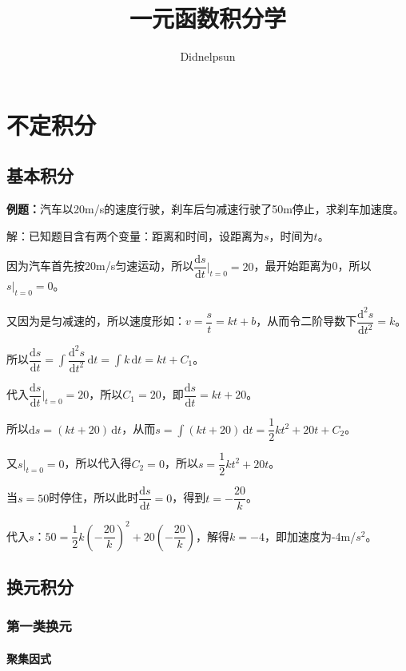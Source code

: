 \documentclass[UTF8, 12pt]{ctexart}
\author{Didnelpsun}
\title{一元函数积分学}
\date{}
\begin{document}
\maketitle
\pagestyle{empty}
\thispagestyle{empty}
\tableofcontents
\thispagestyle{empty}
\newpage
\pagestyle{plain}
\setcounter{page}{1}
\section{不定积分}
\subsection{基本积分}

\textbf{例题：}汽车以20m/s的速度行驶，刹车后匀减速行驶了50m停止，求刹车加速度。

解：已知题目含有两个变量：距离和时间，设距离为$s$，时间为$t$。

因为汽车首先按20m/s匀速运动，所以$\dfrac{\textrm{d}s}{\textrm{d}t}\bigg\vert_{t=0}=20$，最开始距离为0，所以$s\vert_{t=0}=0$。

又因为是匀减速的，所以速度形如：$v=\dfrac{s}{t}=kt+b$，从而令二阶导数下$\dfrac{\textrm{d}^2s}{\textrm{d}t^2}=k$。

所以$\displaystyle{\dfrac{\textrm{d}s}{\textrm{d}t}=\int\dfrac{\textrm{d}^2s}{\textrm{d}t^2}\,\textrm{d}t=\int k\,\textrm{d}t}=kt+C_1$。

代入$\dfrac{\textrm{d}s}{\textrm{d}t}\bigg\vert_{t=0}=20$，所以$C_1=20$，即$\dfrac{\textrm{d}s}{\textrm{d}t}=kt+20$。

所以$\textrm{d}s=(kt+20)\,\textrm{d}t$，从而$s=\displaystyle{\int(kt+20)\,\textrm{d}t}=\dfrac{1}{2}kt^2+20t+C_2$。

又$s\vert_{t=0}=0$，所以代入得$C_2=0$，所以$s=\dfrac{1}{2}kt^2+20t$。

当$s=50$时停住，所以此时$\dfrac{\textrm{d}s}{\textrm{d}t}=0$，得到$t=-\dfrac{20}{k}$。

代入$s$：$50=\dfrac{1}{2}k\left(-\dfrac{20}{k}\right)^2+20\left(-\dfrac{20}{k}\right)$，解得$k=-4$，即加速度为-4m/$s^2$。

\subsection{换元积分}

\subsubsection{第一类换元}

\paragraph{聚集因式} \leavevmode \medskip
\end{document}
